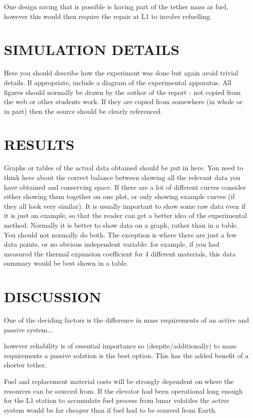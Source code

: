 \documentclass[twocolumn,prl,nobalancelastpage,aps,10pt]{revtex4-1}
\begin{document}
One design saving that is possible is having part of the tether mass as fuel, however this would then require the repair at L1 to involve refuelling.

\section{SIMULATION DETAILS}

Here you should describe how the experiment was done but again avoid trivial details.  If appropriate, include a
diagram of the experimental apparatus. All figures should normally be drawn by the author of the report - not copied
from the web or other students work.  If they are copied from somewhere (in whole or in part) then the source should be
clearly referenced.

\section{RESULTS}

Graphs or tables of the actual data obtained should be put in here.  You need to think here about the correct balance
between showing all the relevant data you have obtained and conserving space.  If there are a lot of different curves
consider either showing them together on one plot, or only showing example curves (if they all look very similar).  It
is usually important to show some raw data even if it is just an example, so that the reader can get a better idea of
the experimental method.  Normally it is better to show data on a graph, rather than in a table. You should not
normally do both.  The exception is where there are just a few data points, or no obvious independent variable: for
example, if you had measured the thermal expansion coefficient for 4 different materials, this data summary would be
best shown in a table.

\section{DISCUSSION}

One of the deciding factors is the difference in mass requirements of an active and passive system...


however reliability is of essential importance so (despite/additionally) to mass requirements a passive solution is the best option. This has the added benefit of a shorter tether.

Fuel and replacement material costs will be strongly dependent on where the resources can be sourced from. If the elevator had been operational long enough for the L1 station to accumulate fuel process from lunar volatiles the active system would be far cheaper than if fuel had to be sourced from Earth.
\end{document}
